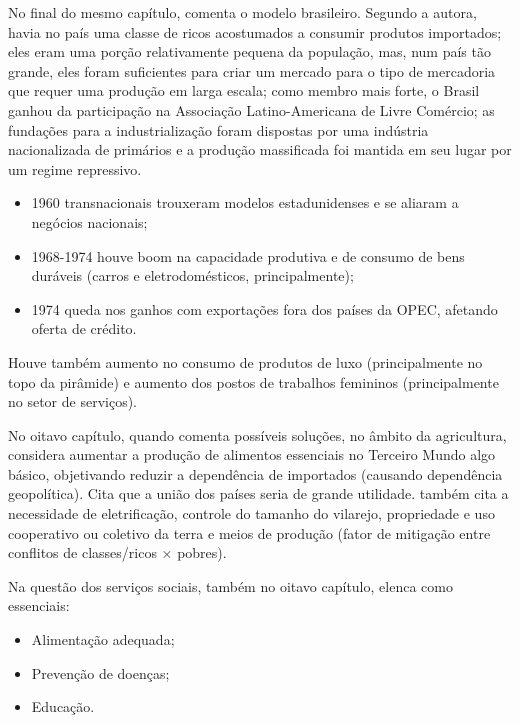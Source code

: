 	No final do mesmo capítulo,  comenta o modelo brasileiro. Segundo a autora,  havia no país uma classe de ricos acostumados a consumir produtos importados; eles eram uma porção relativamente pequena da população, mas, num país tão grande, eles foram suficientes para criar um mercado para o tipo de mercadoria que requer uma produção em larga escala; como membro mais forte, o Brasil ganhou da participação na Associação Latino-Americana de Livre Comércio; as fundações para a industrialização foram dispostas por uma indústria nacionalizada de primários e a produção massificada foi mantida em seu lugar por um regime repressivo.
	
	\begin{itemize}
		\item 1960 transnacionais trouxeram modelos estadunidenses e se aliaram a negócios nacionais;
		\item 1968-1974 houve boom na capacidade produtiva e de consumo de bens duráveis (carros e eletrodomésticos, principalmente);
		\item 1974 queda nos ganhos com exportações fora dos países da OPEC, afetando oferta de crédito.
	\end{itemize}

	Houve também aumento no consumo de produtos de luxo (principalmente no topo da pirâmide) e aumento dos postos de trabalhos femininos (principalmente no setor de serviços).
	
	No oitavo capítulo, quando comenta possíveis soluções, no âmbito da agricultura,  considera aumentar a produção de alimentos essenciais no Terceiro Mundo algo básico, objetivando reduzir a dependência de importados (causando dependência geopolítica). Cita que a união dos países seria de grande utilidade.  também cita a necessidade de eletrificação, controle do tamanho do vilarejo, propriedade e uso cooperativo ou coletivo da terra e meios de produção (fator de mitigação entre conflitos de classes/ricos × pobres).
	
	Na questão dos serviços sociais, também no oitavo capítulo,  elenca como essenciais:
	\begin{itemize}
		\item Alimentação adequada;
		\item Prevenção de doenças;
		\item Educação.
	\end{itemize}
	
